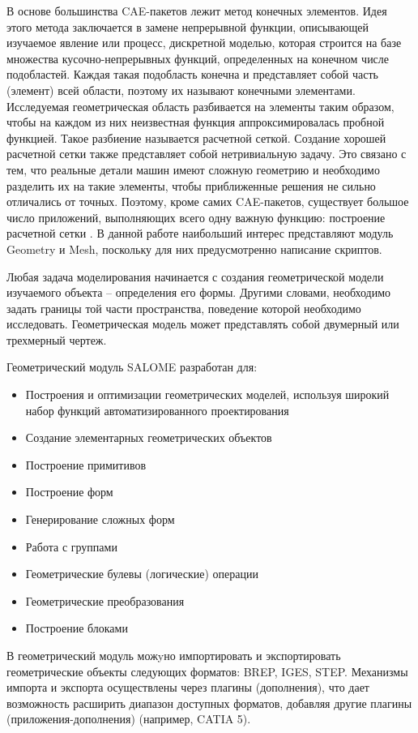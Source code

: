 \documentclass[a4paper,12pt]{article}
\theoremstyle{plain} %
\theoremstyle{definition} %
\theoremstyle{remark} %
\begin{document}
	В основе большинства CAE-пакетов лежит метод конечных элементов. Идея этого метода заключается в замене непрерывной функции, описывающей изучаемое явление или процесс, дискретной моделью, которая строится на базе множества кусочно-непрерывных функций, определенных на конечном числе подобластей. Каждая такая подобласть конечна и представляет собой часть (элемент) всей области, поэтому их называют конечными элементами. Исследуемая геометрическая область разбивается на элементы таким образом, чтобы на каждом из них неизвестная функция аппроксимировалась пробной функцией. Такое разбиение называется расчетной сеткой. Создание хорошей расчетной сетки также представляет собой нетривиальную задачу. Это связано с тем, что реальные детали машин имеют сложную геометрию и необходимо разделить их на такие элементы, чтобы приближенные решения не сильно отличались от точных. Поэтому, кроме самих CAE-пакетов, существует большое число приложений, выполняющих всего одну важную функцию: построение расчетной сетки \cite{wIbmSalome}. В данной работе наибольший интерес представляют модуль Geometry и Mesh, поскольку для них предусмотренно написание скриптов.
	
	Любая задача моделирования начинается с создания геометрической модели изучаемого объекта – определения его формы. Другими словами, необходимо задать границы той части пространства, поведение которой необходимо исследовать. Геометрическая модель может представлять собой двумерный или трехмерный чертеж.
		
	Геометрический модуль SALOME разработан для:
	\begin{itemize}
		\item Построения и оптимизации геометрических моделей, используя широкий набор функций автоматизированного проектирования
		\item Создание элементарных геометрических объектов
		\item Построение примитивов
		\item Построение форм
		\item Генерирование сложных форм
		\item Работа с группами
		\item Геометрические булевы (логические) операции
		\item Геометрические преобразования
		\item Построение блоками
	\end{itemize}
	
	В геометрический модуль можyно импортировать и экспортировать
	геометрические объекты следующих форматов: BREP, IGES, STEP. Механизмы импорта и экспорта осуществлены через плагины (дополнения), что дает возможность расширить диапазон доступных форматов, добавляя другие плагины (приложения-дополнения) (например, CATIA 5)\cite{wLadugaGeom}.
	
\end{document}
